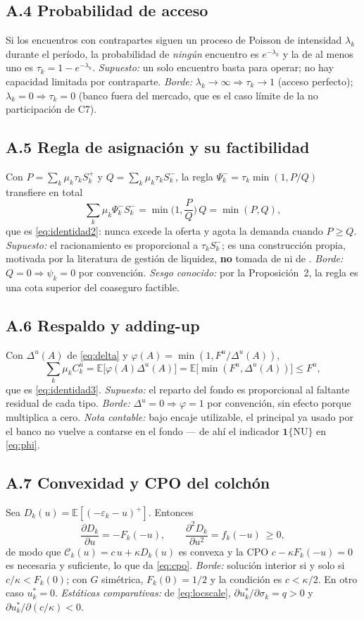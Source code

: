 \documentclass[11pt]{article}
\newcommand{\E}{\mathbb{E}}
\newcommand{\NU}{\mathrm{NU}}
\theoremstyle{definition}
\begin{document}
\subsection*{A.4 Probabilidad de acceso}
Si los encuentros con contrapartes siguen un proceso de Poisson de intensidad
$\lambda_k$ durante el per\'iodo, la probabilidad de \emph{ning\'un} encuentro es
$e^{-\lambda_k}$ y la de al menos uno es $\tau_k=1-e^{-\lambda_k}$.
\emph{Supuesto:} un solo encuentro basta para operar; no hay capacidad limitada
por contraparte. \emph{Borde:} $\lambda_k\to\infty\Rightarrow\tau_k\to1$ (acceso
perfecto); $\lambda_k=0\Rightarrow\tau_k=0$ (banco fuera del mercado, que es el
caso l\'imite de la no participaci\'on de C7).

\subsection*{A.5 Regla de asignaci\'on y su factibilidad}
Con $P=\sum_k\mu_k\tau_k S^+_k$ y $Q=\sum_k\mu_k\tau_k S^-_k$, la regla
$\Psi^-_k=\tau_k\min(1,P/Q)$ transfiere en total
\[
\sum_k\mu_k\Psi^-_k S^-_k=\min\!\Big(1,\frac{P}{Q}\Big)\,Q=\min(P,Q),
\]
que es \eqref{eq:identidad2}: nunca excede la oferta y agota la demanda cuando
$P\ge Q$. \emph{Supuesto:} el racionamiento es proporcional a $\tau_k S^-_k$;
es una construcci\'on propia, motivada por la literatura de gesti\'on de liquidez,
\textbf{no} tomada de \citet{bianchibigio2022} ni de \citet{afonso2015}.
\emph{Borde:} $Q=0\Rightarrow\psi_k=0$ por convenci\'on. \emph{Sesgo conocido:}
por la Proposici\'on~2, la regla es una cota superior del coaseguro factible.

\subsection*{A.6 Respaldo y adding-up}
Con $\Delta^u(A)$ de \eqref{eq:delta} y $\varphi(A)=\min(1,F^u/\Delta^u(A))$,
\[
\sum_k\mu_k C^u_k=\E\big[\varphi(A)\Delta^u(A)\big]
=\E\big[\min(F^u,\Delta^u(A))\big]\le F^u,
\]
que es \eqref{eq:identidad3}. \emph{Supuesto:} el reparto del fondo es
proporcional al faltante residual de cada tipo. \emph{Borde:}
$\Delta^u=0\Rightarrow\varphi=1$ por convenci\'on, sin efecto porque multiplica a
cero. \emph{Nota contable:} bajo encaje utilizable, el principal ya usado por el
banco no vuelve a contarse en el fondo --- de ah\'i el indicador
$\mathbf{1}\{\NU\}$ en \eqref{eq:phi}.

\subsection*{A.7 Convexidad y CPO del colch\'on}
Sea $D_k(u)=\E[(-\varepsilon_k-u)^+]$. Entonces
\[
\frac{\partial D_k}{\partial u}=-F_k(-u),
\qquad
\frac{\partial^2 D_k}{\partial u^2}=f_k(-u)\ \ge 0,
\]
de modo que $\mathcal{C}_k(u)=c\,u+\kappa D_k(u)$ es convexa y la CPO
$c-\kappa F_k(-u)=0$ es necesaria y suficiente, lo que da \eqref{eq:cpo}.
\emph{Borde:} soluci\'on interior si y solo si $c/\kappa<F_k(0)$; con $G$
sim\'etrica, $F_k(0)=1/2$ y la condici\'on es $c<\kappa/2$. En otro caso
$u^*_k=0$. \emph{Est\'aticas comparativas:} de \eqref{eq:locscale},
$\partial u^*_k/\partial\sigma_k=q>0$ y
$\partial u^*_k/\partial(c/\kappa)<0$.
\end{document}
